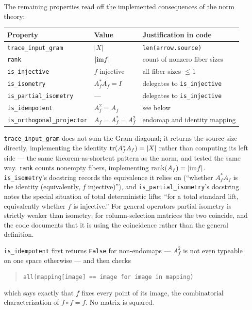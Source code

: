 The remaining properties read off the implemented consequences of the norm
theory:

\begin{center}
\begin{tabular}{@{}lll@{}}
\toprule
Property & Value & Justification in code \\
\midrule
\texttt{trace\_input\_gram} & $|X|$ & \texttt{len(arrow.source)} \\
\texttt{rank} & $|\mathrm{im} f|$ & count of nonzero fiber sizes \\
\texttt{is\_injective} & $f$ injective & all fiber sizes $\le 1$ \\
\texttt{is\_isometry} & $A_f^*A_f = I$ & delegates to \texttt{is\_injective} \\
\texttt{is\_partial\_isometry} & --- & delegates to \texttt{is\_injective} \\
\texttt{is\_idempotent} & $A_f^2 = A_f$ & see below \\
\texttt{is\_orthogonal\_projector} & $A_f = A_f^* = A_f^2$ & endomap and identity mapping \\
\bottomrule
\end{tabular}
\end{center}

\texttt{trace\_input\_gram} does not sum the Gram diagonal; it returns the
source size directly, implementing the identity
$\mathrm{tr}(A_f^* A_f) = |X|$ rather than computing its left side ---
the same theorem-as-shortcut pattern as the norm, and tested the same way.
\texttt{rank} counts nonempty fibers, implementing
$\mathrm{rank}(A_f) = |\mathrm{im} f|$. \texttt{is\_isometry}'s docstring records the
equivalence it relies on (``whether $A_f^* A_f$ is the identity
(equivalently, $f$ injective)''), and \texttt{is\_partial\_isometry}'s
docstring notes the special situation of total deterministic lifts: ``for a
total standard lift, equivalently whether $f$ is injective.'' For general
operators partial isometry is strictly weaker than isometry; for
column-selection matrices the two coincide, and the code documents that it
is using the coincidence rather than the general definition.

\texttt{is\_idempotent} first returns \texttt{False} for non-endomaps ---
$A_f^2$ is not even typeable on one space otherwise --- and then checks

\begin{quote}
\texttt{all(mapping[image] == image for image in mapping)}
\end{quote}

which says exactly that $f$ fixes every point of its image, the
combinatorial characterization of $f \circ f = f$. No matrix is squared.

